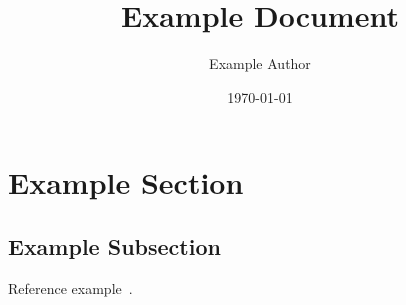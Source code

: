 \documentclass[12pt,a4paper]{article}
\title{Example Document}
\author{Example Author}
\date{\today}
\begin{document}
\maketitle

\tableofcontents

\section{Example Section}

\subsection{Example Subsection}

Reference example~\cite{Example_2024}.
\blindtext{}

\printbibliography{}
\end{document}
